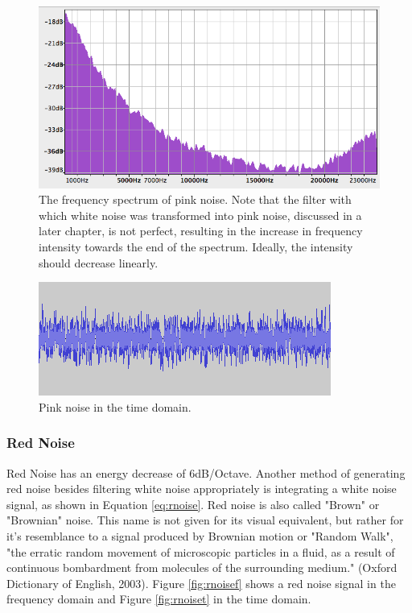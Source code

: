 \begin{figure}[t!]
  \includegraphics[scale=0.6]{img/pnoisef}
  \caption{The frequency spectrum of pink noise. Note that the filter with which white noise was transformed into pink noise, discussed in a later chapter, is not perfect, resulting in the increase in frequency intensity towards the end of the spectrum. Ideally, the intensity should decrease linearly.}
  \label{fig:pnoisef}
\end{figure}

\begin{figure}[t!]
  \includegraphics[scale=0.7]{img/pnoiset}
  \caption{Pink noise in the time domain.}
  \label{fig:pnoiset}
\end{figure}

\pagebreak

\subsubsection{Red Noise}

Red Noise has an energy decrease of 6dB/Octave. Another method of generating red noise besides filtering white noise appropriately is integrating a white noise signal, as shown in Equation \ref{eq:rnoise}. Red noise is also called "Brown" or "Brownian" noise. This name is not given for its visual equivalent, but rather for it's resemblance to a signal produced by Brownian motion or "Random Walk", "the erratic random movement of microscopic particles in a fluid, as a result of continuous bombardment from molecules of the surrounding medium." (Oxford Dictionary of English, 2003). Figure \ref{fig:rnoisef} shows a red noise signal in the frequency domain and Figure \ref{fig:rnoiset} in the time domain.

